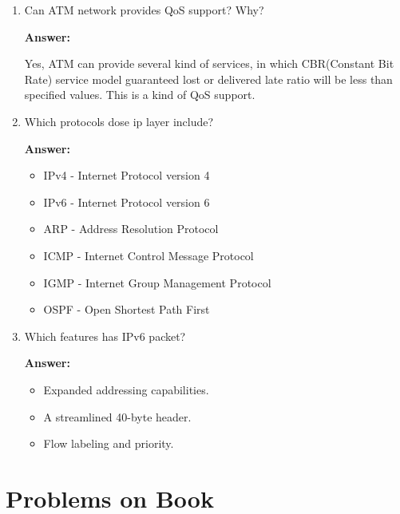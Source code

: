 \begin{enumerate}
    \item Can ATM network provides QoS support? Why?

    \textbf{Answer:}
    
    Yes, ATM can provide several kind of services, in which CBR(Constant Bit Rate) service model guaranteed lost or delivered late ratio will be less than specified values. This is a kind of QoS support.

    \item Which protocols dose ip layer include?

    \textbf{Answer:}

    \begin{itemize}
        \item IPv4 - Internet Protocol version 4
        \item IPv6 - Internet Protocol version 6
        \item ARP - Address Resolution Protocol
        \item ICMP - Internet Control Message Protocol
        \item IGMP - Internet Group Management Protocol
        \item OSPF - Open Shortest Path First
    \end{itemize}    

    \item Which features has IPv6 packet?

    \textbf{Answer:}

    \begin{itemize}
        \item Expanded addressing capabilities.
        \item A streamlined 40-byte header.
        \item Flow labeling and priority.
    \end{itemize}
\end{enumerate}

\section{Problems on Book}

